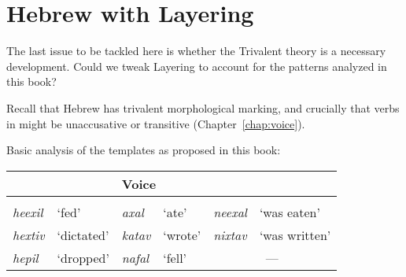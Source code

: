 

\section{Hebrew with Layering} \label{aas:hebrew}
The last issue to be tackled here is whether the Trivalent theory is a necessary development. Could we tweak Layering to account for the patterns analyzed in this book?

Recall that Hebrew has trivalent morphological marking, and crucially that verbs in {\tkal} might be unaccusative or transitive (Chapter~\ref{chap:voice}).

\ex\label{ex:aas:alternations-heb2}Basic analysis of the templates as proposed in this book:\\
	\begin{tabular}{ll|ll|ll}
	 \multicolumn{2}{P{4.7cm}|}{\textbf{\vd}}	&	\multicolumn{2}{P{4cm}|}{\textbf{Voice}}	& \multicolumn{2}{P{4cm}}{\textbf{\vz}}\\\hline
	\multicolumn{2}{c|}{\thif}	&	\multicolumn{2}{c|}{\tkal}	& \multicolumn{2}{c}{\tnif}\\
	\emph{heexil}	& `fed' &	\emph{axal}	& `ate'	&	\emph{neexal}	& `was eaten' \\
	\emph{hextiv}	& `dictated' &	\emph{katav}	& `wrote'	&	\emph{nixtav}	& `was written' \\ %
	\emph{hepil} & `dropped' & \emph{nafal}	& `fell' & \multicolumn{2}{c}{---}\\
	\end{tabular}
\xe

